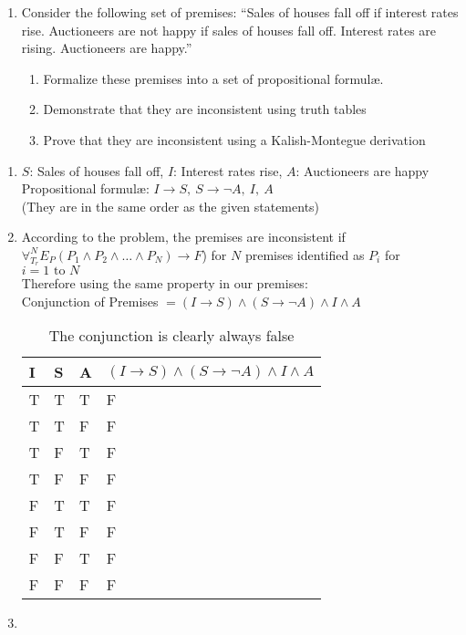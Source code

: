 \documentclass[10.5pt]{article}
\newenvironment{solution}[2][Solution]{ \begin{trivlist}
\item[\hskip \labelsep {\bfseries #1}]}{\end{trivlist}}
\newenvironment{problem}[2][Problem]{\begin{trivlist}
\item[\hskip \labelsep {\bfseries #1}\hskip \labelsep {\bfseries #2.}]}{\end{trivlist}}
\begin{document}
\begin{problem}{5}
\begin{enumerate}
\item Consider the following set of premises: ``Sales of houses fall off if interest rates rise. Auctioneers are not happy if sales of houses fall off. Interest rates are rising. Auctioneers are happy.''
  \begin{enumerate}
  \item Formalize these premises into a set of propositional formul{\ae}.
  \item Demonstrate that they are inconsistent using truth tables
  \item Prove that they are inconsistent using a Kalish-Montegue derivation
  \end{enumerate}
\end{enumerate}
\end{problem}
\begin{solution}{5}
\item[]
\begin{enumerate}[label=(\alph*)]
  \itemsep=0in
\item $S$: Sales of houses fall off, $I$: Interest rates rise, $A$: Auctioneers are happy \\
Propositional formul\ae: $I \rightarrow S,\ S \rightarrow \lnot A,\ I,\ A$ \\ (They are in the same order as the given statements)
\item According to the problem, the premises are inconsistent if $\forall_{T_r}^N E_P(P_1 \wedge P_2 \wedge \ldots \wedge P_N) \rightarrow F$) for $N$ premises identified as $P_i$ for $i = 1 \mbox{ to } N$ \\ Therefore using the same property in our premises:\\
Conjunction of Premises $= (I \rightarrow S) \wedge (S \rightarrow \lnot A) \wedge I \wedge A$ \\

\begin{table}[!h]
\centering
\caption{The conjunction is clearly always false}
\label{my-label}
\begin{tabular}{|l|l|l|l|}
\hline
I & S & A & $(I \rightarrow S) \wedge (S \rightarrow \lnot A) \wedge I \wedge A$ \\ \hline
T & T & T & F \\ \hline
T & T & F & F \\ \hline
T & F & T & F \\ \hline
T & F & F & F \\ \hline
F & T & T & F \\ \hline
F & T & F & F \\ \hline
F & F & T & F \\ \hline
F & F & F & F \\ \hline
\end{tabular}
\end{table}

\item \pagebreak

\end{enumerate}
\end{solution}
\end{document}
